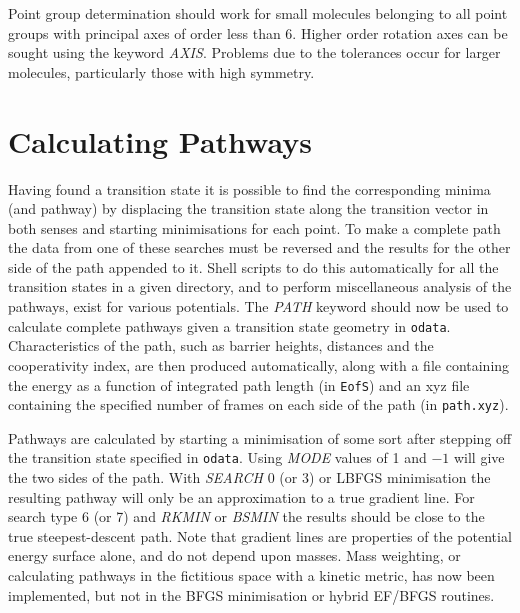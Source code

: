 \documentclass[12pt,a4paper,dvips]{article}
\begin{document}
Point group determination should work for small molecules belonging to all point groups with 
principal axes of order less than 6. Higher order rotation axes can be sought using the
keyword {\it AXIS\/}. Problems due to the tolerances occur for larger molecules,
particularly those with high symmetry. 

\section{Calculating Pathways}
\label{sec:pathways}
Having found a transition state it is possible to
find the corresponding minima (and pathway) by displacing the transition state along
the transition vector in both senses and starting minimisations for each point. To make
a complete path the data from one of these searches must be reversed and the results
for the other side of the path appended to it. Shell scripts to do this automatically
for all the transition states in a given directory, and to perform miscellaneous analysis
of the pathways, exist for various potentials. The {\it PATH\/} keyword should now be
used to calculate complete pathways given a transition state geometry in {\tt odata}.
Characteristics of the path, such as barrier heights, distances and the cooperativity index,
are then produced automatically, along with a file containing the energy as a function
of integrated path length (in {\tt EofS}) and an xyz file containing the specified number
of frames on each side of the path (in {\tt path.xyz}).

Pathways are calculated by starting a minimisation of some sort after stepping off the
transition state specified in {\tt odata}.
Using {\it MODE\/} values of 1 and $-1$ will give the two sides of the path.
With {\it SEARCH\/} 0 (or 3) or LBFGS minimisation 
the resulting pathway will only be an approximation to a true
gradient line. For search type 6 (or 7) and {\it RKMIN\/} or {\it BSMIN\/} 
the results should be close to the true steepest-descent
path. Note that gradient lines are properties of the potential energy surface alone, and
do not depend upon masses. Mass weighting, or calculating pathways in the fictitious
space with a kinetic metric,\cite{banerjeea92} has now been implemented, but not in the BFGS
minimisation or hybrid EF/BFGS routines.
\end{document}

